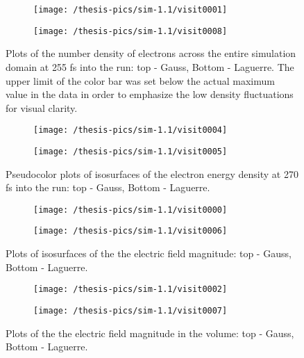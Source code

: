 \documentclass[12pt, class=report, crop=false]{standalone}
\begin{document}
\begin{figure}[!h]
  \centering
  \begin{subfigure}[t]{1\textwidth}
    \centering
    \texttt{[image: /thesis-pics/sim-1.1/visit0001]}
  \end{subfigure}
  \hfill
  \begin{subfigure}[t]{1\textwidth}
    \centering
    \texttt{[image: /thesis-pics/sim-1.1/visit0008]}
  \end{subfigure}
  \caption{Plots of the number density of electrons across the entire simulation domain at 255 fs into the run: top - Gauss, Bottom - Laguerre. The upper limit of the color bar was set below the actual maximum value in the data in order to emphasize the low density fluctuations for visual clarity.}%
  \label{fig:density-sim-2}%
\end{figure}

\begin{figure}[!h]
  \centering
  \begin{subfigure}[t]{1\textwidth}
    \centering
    \texttt{[image: /thesis-pics/sim-1.1/visit0004]}
  \end{subfigure}
  \hfill
  \begin{subfigure}[t]{1\textwidth}
    \centering
    \texttt{[image: /thesis-pics/sim-1.1/visit0005]}
  \end{subfigure}
  \caption{Pseudocolor plots of isosurfaces of the electron energy density at 270 fs into the run: top - Gauss, Bottom - Laguerre.}%
  \label{fig:beams-sim-2}%
\end{figure}

\begin{figure}[!h]
  \centering
  \begin{subfigure}[t]{1\textwidth}
    \centering
    \texttt{[image: /thesis-pics/sim-1.1/visit0000]}
  \end{subfigure}
  \hfill
  \begin{subfigure}[t]{1\textwidth}
    \centering
    \texttt{[image: /thesis-pics/sim-1.1/visit0006]}
  \end{subfigure}
  \caption{Plots of isosurfaces of the the electric field magnitude: top - Gauss, Bottom - Laguerre.}%
  \label{fig:laserbeams-sim-2}%
\end{figure}

\begin{figure}[!h]
  \centering
  \begin{subfigure}[t]{1\textwidth}
    \centering
    \texttt{[image: /thesis-pics/sim-1.1/visit0002]}
  \end{subfigure}
  \hfill
  \begin{subfigure}[t]{1\textwidth}
    \centering
    \texttt{[image: /thesis-pics/sim-1.1/visit0007]}
  \end{subfigure}
  \caption{Plots of the the electric field magnitude in the volume: top - Gauss, Bottom - Laguerre.}%
  \label{fig:laserbeams2-sim-2}%
\end{figure}
\end{document}
